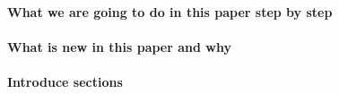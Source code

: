 \paragraph{What we are going to do in this paper step by step}

\paragraph{What is new in this paper and why}

\paragraph{Introduce sections}


% 
% 
% 
% 
% 
% 

